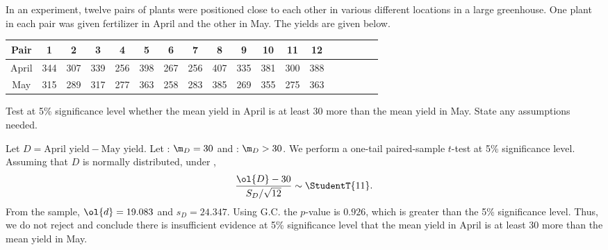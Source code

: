 \begin{problem}
    In an experiment, twelve pairs of plants were positioned close to each other in various different locations in a large greenhouse. One plant in each pair was given fertilizer in April and the other in May. The yields are given below.

    \begin{table}[H]
        \centering
        \begin{tabular}{|c|c|c|c|c|c|c|c|c|c|c|c|c|c|c|c|c|c|}
            \hline Pair & 1 & 2 & 3 & 4 & 5 & 6 & 7 & 8 & 9 & 10 & 11 & 12 \\ \hline
            April & 344 & 307 & 339 & 256 & 398 & 267 & 256 & 407 & 335 & 381 & 300 & 388 \\ \hline
            May & 315 & 289 & 317 & 277 & 363 & 258 & 283 & 385 & 269 & 355 & 275 & 363 \\ \hline
        \end{tabular}
    \end{table}

    Test at 5\% significance level whether the mean yield in April is at least 30 more than the mean yield in May. State any assumptions needed.
\end{problem}
\begin{solution}
    Let $D = \text{April yield} - \text{May yield}$. Let \nullhyp: $\m_D = 30$ and \althyp: $\m_D > 30$. We perform a one-tail paired-sample $t$-test at 5\% significance level. Assuming that $D$ is normally distributed, under \nullhyp, \[\frac{\ol{D} - 30}{S_D / \sqrt{12}} \sim \StudentT{11}.\] From the sample, $\ol{d} = 19.083$ and $s_D = 24.347$. Using G.C. the $p$-value is $0.926$, which is greater than the 5\% significance level. Thus, we do not reject \nullhyp{} and conclude there is insufficient evidence at 5\% significance level that the mean yield in April is at least 30 more than the mean yield in May.
\end{solution}

